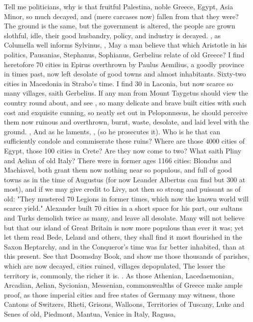 Tell me politicians, why is that fruitful Palestina, noble Greece, Egypt, Asia
Minor, so much decayed, and (mere carcases now) fallen from that they were? The
ground is the same, but the government is altered, the people are grown
slothful, idle, their good husbandry, policy, and industry is decayed. , as Columella well informs
Sylvinus, , \etc{} May a man believe that which
Aristotle in his politics, Pausanias, Stephanus, Sophianus, Gerbelius relate of
old Greece? I find heretofore 70 cities in Epirus overthrown by Paulus
Aemilius, a goodly province in times past, now left
desolate of good towns and almost inhabitants. Sixty-two cities in Macedonia in
Strabo's time. I find 30 in Laconia, but now scarce so many villages, saith
Gerbelius. If any man from Mount Taygetus should view the country round about,
and see , so many
delicate and brave built cities with such cost and exquisite cunning, so neatly
set out in Peloponnesus, he should perceive them now
ruinous and overthrown, burnt, waste, desolate, and laid level with the ground.
, \etc{} And as he laments, , (so he prosecutes it).
Who is he that can sufficiently condole and commiserate
these ruins? Where are those 4000 cities of Egypt, those 100 cities in Crete?
Are they now come to two? What saith Pliny and Aelian of old Italy? There were
in former ages 1166 cities: Blondus and Machiavel, both grant them now nothing
near so populous, and full of good towns as in the time of Augustus (for now
Leander Albertus can find but 300 at most), and if we may give credit to
Livy, not then so strong and puissant as of old: "They
mustered 70 Legions in former times, which now the known world will scarce
yield." Alexander built 70 cities in a short space for his part, our sultans
and Turks demolish twice as many, and leave all desolate. Many will not believe
but that our island of Great Britain is now more populous than ever it was; yet
let them read Bede, Leland and others, they shall find it most flourished in
the Saxon Heptarchy, and in the Conqueror's time was far better inhabited, than
at this present. See that Doomsday Book, and show me those thousands of
parishes, which are now decayed, cities ruined, villages depopulated, \etc{}
The lesser the territory is, commonly, the richer it is. . As those Athenian, Lacedaemonian, Arcadian, Aelian, Sycionian,
Messenian, \etc{} commonwealths of Greece make ample proof, as those imperial
cities and free states of Germany may witness, those Cantons of Switzers,
Rheti, Grisons, Walloons, Territories of Tuscany, Luke and Senes of old,
Piedmont, Mantua, Venice in Italy, Ragusa, \etc{}

